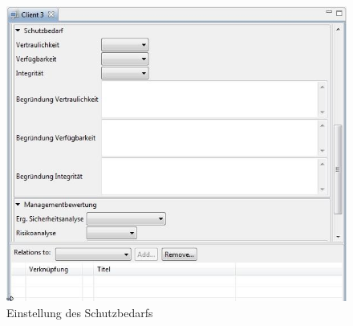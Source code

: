 \documentclass[a4paper,10pt]{book}
\begin{document}
\newline
\begin{figure}[htb!]
  \centering
  \includegraphics[scale=.57]{Screenshot/Schutzbedarf.jpg}
  \caption{\label{Einstellung des Schutzbedarfs} Einstellung des Schutzbedarfs}
\end{figure}
\newline
\end{document}
